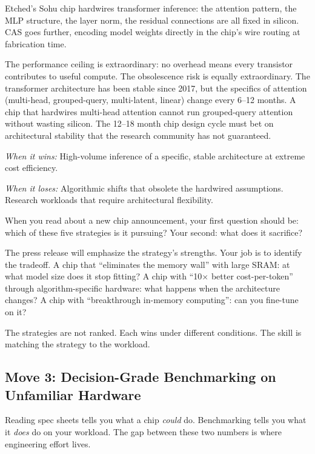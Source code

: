 Etched's Sohu chip hardwires transformer inference: the attention pattern, the MLP structure, the layer norm, the residual connections are all fixed in silicon. CAS goes further, encoding model weights directly in the chip's wire routing at fabrication time.

The performance ceiling is extraordinary: no overhead means every transistor contributes to useful compute. The obsolescence risk is equally extraordinary. The transformer architecture has been stable since 2017, but the specifics of attention (multi-head, grouped-query, multi-latent, linear) change every 6--12 months. A chip that hardwires multi-head attention cannot run grouped-query attention without wasting silicon. The 12--18 month chip design cycle must bet on architectural stability that the research community has not guaranteed.

\textit{When it wins:} High-volume inference of a specific, stable architecture at extreme cost efficiency.

\textit{When it loses:} Algorithmic shifts that obsolete the hardwired assumptions. Research workloads that require architectural flexibility.

\begin{taste}
When you read about a new chip announcement, your first question should be: which of these five strategies is it pursuing? Your second: what does it sacrifice?

The press release will emphasize the strategy's strengths. Your job is to identify the tradeoff. A chip that ``eliminates the memory wall'' with large SRAM: at what model size does it stop fitting? A chip with ``10$\times$ better cost-per-token'' through algorithm-specific hardware: what happens when the architecture changes? A chip with ``breakthrough in-memory computing'': can you fine-tune on it?

The strategies are not ranked. Each wins under different conditions. The skill is matching the strategy to the workload.
\end{taste}

\subsection*{Move 3: Decision-Grade Benchmarking on Unfamiliar Hardware}

Reading spec sheets tells you what a chip \textit{could} do. Benchmarking tells you what it \textit{does} do on your workload. The gap between these two numbers is where engineering effort lives.

